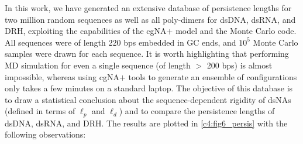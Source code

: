 In this work, we have generated an extensive database of persistence lengths for two million random sequences as well as all poly-dimers for dsDNA, dsRNA, and DRH, exploiting the capabilities of the cgNA$+$ model and the Monte Carlo code.
All sequences were of length 220 bps embedded in GC ends, and $10^5$ Monte Carlo samples were drawn for each sequence.
It is worth highlighting that performing MD simulation for even a single sequence (of length $>$ 200 bps) is almost impossible, whereas using cgNA$+$ tools to generate an ensemble of configurations only takes a few minutes on a standard laptop.
The objective of this database is to draw a statistical conclusion about the sequence-dependent rigidity of dsNAs (defined in terms of $\ell_{p}$ and $\ell_{d}$) and to compare the persistence lengths of dsDNA, dsRNA, and DRH.
The results are plotted in \cref{c4:fig6_persis} with the following observations:
